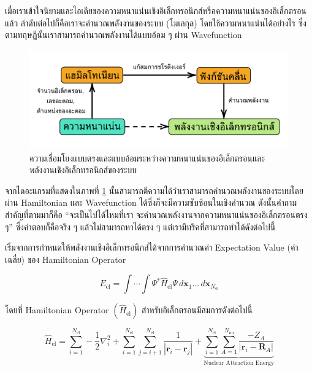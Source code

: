 เมื่อเราเข้าใจนิยามและไอเดียของความหนาแน่นเชิงอิเล็กทรอนิกส์หรือความหนาแน่นของอิเล็กตรอนแล้ว ลำดับต่อไปก็คือเราจะคำนวณพลังงานของระบบ
(โมเลกุล) โดยใช้ความหนาแน่นได้อย่างไร ซึ่งตามทฤษฎีนั้นเราสามารถคำนวณพลังงานได้แบบอ้อม ๆ ผ่าน Wavefunction

\begin{figure}[H]
    \centering
    \includegraphics[width=\linewidth]{fig/density_wavefunc_ener.png}
    \caption{ความเชื่อมโยงแบบตรงและแบบอ้อมระหว่างความหนาแน่นของอิเล็กตรอนและพลังงานเชิงอิเล็กทรอนิกส์ของระบบ}
    \label{fig:density_wavefunc_ener}
\end{figure}

จากไดอะแกรมที่แสดงในภาพที่ \ref{fig:density_wavefunc_ener} นั้นสามารถตีความได้ว่าเราสามารถคำนวณพลังงานของระบบโดยผ่าน
Hamiltonian และ Wavefunction ได้ซึ่งก็จะมีความซับซ้อนในเชิงคำนวณ ดังนั้นคำถามสำคัญที่ตามมาก็คือ \enquote{จะเป็นไปได้ไหมที่เรา%
    จะคำนวณพลังงานจากความหนาแน่นของอิเล็กตรอนตรง ๆ} ซึ่งคำตอบก็คือจริง ๆ แล้วไม่สามารถหาได้ตรง ๆ แต่เรามีทริคที่สามารถทำได้ดังต่อไปนี้

เริ่มจากการกำหนดให้พลังงานเชิงอิเล็กทรอนิกส์ได้จากการคำนวณค่า Expectation Value (ค่าเฉลี่ย) ของ Hamiltonian Operator

\begin{equation}\label{eq:ener_expect_value}
    E_{\text{el}} = \int \cdots \int \Psi^{\ast} \hat{H}_{\text{el}} \Psi \, d\bm{x}_{1} \dots \,
    d\bm{x}_{N_{\text{el}}}
\end{equation}

\noindent โดยที่ Hamiltonian Operator $(\hat{H}_{\text{el}})$ สำหรับอิเล็กตรอนมีสมการดังต่อไปนี้

\begin{equation}\label{eq:hamil_one_elec}
    \hat{H}_{\text{el}} = \sum^{N_{\text{el}}}_{i=1} -\frac{1}{2} \nabla^{2}_{i}
    + \sum^{N_{\text{el}}}_{i=1} \sum^{N_{\text{el}}}_{j=i+1} \frac{1}{|\bm{r}_{i}-\bm{r}_{j}|}
    + \underbrace{\sum^{N_{\text{el}}}_{i=1} \sum^{N_{\text{nu}}}_{A=1} \frac{-Z_{A}}{|\bm{r}_{i}-\bm{R}_{A}|}}%
    _{\text{Nuclear Attraction Energy}}
\end{equation}

